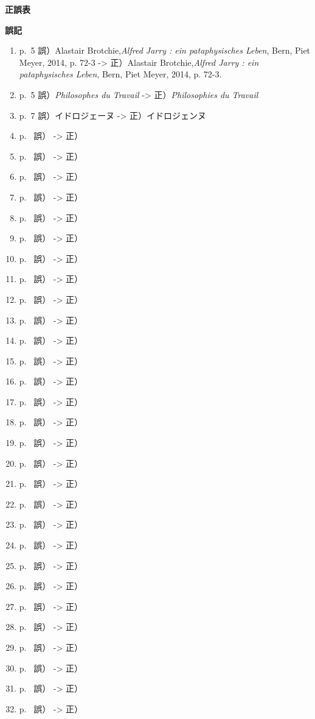 \begin{center}
 \textbf{正誤表} 
\end{center}

\textbf{誤記}
\begin{enumerate}
  \item p.~5 誤）Alastair Brotchie,\emph{Alfred Jarry : ein pataphysisches Leben}, Bern, Piet Meyer, 2014, p. 72-3 -> 正）Alastair Brotchie,\emph{Alfred Jarry : ein pataphysisches Leben}, Bern, Piet Meyer, 2014, p. 72-3.
  \item p.~5 誤）\emph{Philosophes du Travail} -> 正）\emph{Philosophies du Travail}
  \item p.~7 誤）イドロジェーヌ -> 正）イドロジェンヌ
  \item p.~ 誤） -> 正）
  \item p.~ 誤） -> 正）
  \item p.~ 誤） -> 正）
  \item p.~ 誤） -> 正）
  \item p.~ 誤） -> 正）
  \item p.~ 誤） -> 正）
  \item p.~ 誤） -> 正）
  \item p.~ 誤） -> 正）
  \item p.~ 誤） -> 正）
  \item p.~ 誤） -> 正）
  \item p.~ 誤） -> 正）
  \item p.~ 誤） -> 正）
  \item p.~ 誤） -> 正）
  \item p.~ 誤） -> 正）
  \item p.~ 誤） -> 正）
  \item p.~ 誤） -> 正）
  \item p.~ 誤） -> 正）
  \item p.~ 誤） -> 正）
  \item p.~ 誤） -> 正）
  \item p.~ 誤） -> 正）
  \item p.~ 誤） -> 正）
  \item p.~ 誤） -> 正）
  \item p.~ 誤） -> 正）
  \item p.~ 誤） -> 正）
  \item p.~ 誤） -> 正）
  \item p.~ 誤） -> 正）
  \item p.~ 誤） -> 正）
  \item p.~ 誤） -> 正）
  \item p.~ 誤） -> 正）

\end{enumerate}
